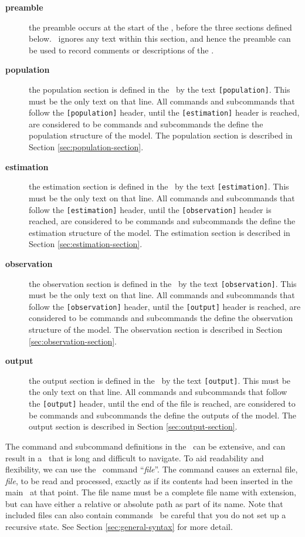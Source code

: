 \begin{description}
\item [\textbf{preamble}] the preamble occurs at the start of the \config, before the three sections defined below. \SPM\ ignores any text within this section, and hence the preamble can be used to record comments or descriptions of the \config. 

\item [\textbf{population}]  the population section is defined in the \config\ by the text \texttt{[population]}. This must be the only text on that line. All commands and subcommands that follow the \texttt{[population]} header, until the \texttt{[estimation]} header is reached, are considered to be commands and subcommands the define the population structure of the model. The population section is described in Section \ref{sec:population-section}.

\item [\textbf{estimation}] the estimation section is defined in the \config\ by the text \texttt{[estimation]}. This must be the only text on that line. All commands and subcommands that follow the \texttt{[estimation]} header, until the \texttt{[observation]} header is reached, are considered to be commands and subcommands the define the estimation structure of the model.  The estimation section is described in Section \ref{sec:estimation-section}.

\item [\textbf{observation}] the observation section is defined in the \config\ by the text \texttt{[observation]}. This must be the only text on that line. All commands and subcommands that follow the \texttt{[observation]} header, until the \texttt{[output]} header is reached, are considered to be commands and subcommands the define the observation structure of the model.  The observation section is described in Section \ref{sec:observation-section}.

\item [\textbf{output}] the output section is defined in the \config\ by the text \texttt{[output]}. This must be the only text on that line. All commands and subcommands that follow the \texttt{[output]} header, until the end of the file is reached, are considered to be commands and subcommands the define the outputs of the model.  The output section is described in Section \ref{sec:output-section}.

\end{description}

The command and subcommand definitions in the \config\ can be extensive, and can result in a \config\ that is long and difficult to navigate. To aid readability and flexibility, we can use the \config\ command  ``\emph{file}''. The command causes an external file, \emph{file}, to be read and processed, exactly as if its contents had been inserted in the main \config\ at that point. The file name must be a complete file name with extension, but can have either a relative or absolute path as part of its name. Note that included files can also contain  commands \textemdash\ be careful that you do not set up a recursive state. See Section \ref{sec:general-syntax} for more detail.

